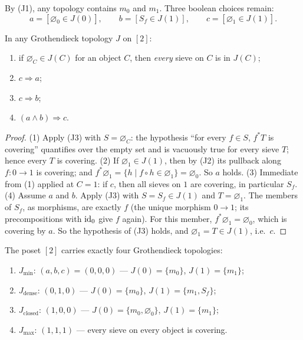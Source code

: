 By (J1), any topology contains $m_0$ and $m_1$. Three boolean
choices remain:
\[
a = [\varnothing_0 \in J(0)], \qquad
b = [S_f \in J(1)], \qquad
c = [\varnothing_1 \in J(1)].
\]

\begin{lemma}\label{ch03:lem:forcing}
In any Grothendieck topology $J$ on $[2]$:
\begin{enumerate}
\item if $\varnothing_C \in J(C)$ for an object $C$, then
\emph{every} sieve on $C$ is in $J(C)$;
\item $c \Rightarrow a$;
\item $c \Rightarrow b$;
\item $(a \wedge b) \Rightarrow c$.
\end{enumerate}
\end{lemma}

\begin{proof}
(1) Apply (J3) with $S = \varnothing_C$: the hypothesis ``for
every $f \in S$, $f^* T$ is covering'' quantifies over the empty
set and is vacuously true for every sieve $T$; hence every $T$ is
covering. (2) If $\varnothing_1 \in J(1)$, then by (J2) its
pullback along $f : 0 \to 1$ is covering; and
$f^* \varnothing_1 = \{h \mid f \circ h \in \varnothing_1\} =
\varnothing_0$. So $a$ holds. (3) Immediate from (1) applied at
$C = 1$: if $c$, then all sieves on $1$ are covering, in
particular $S_f$. (4) Assume $a$ and $b$. Apply (J3) with
$S = S_f \in J(1)$ and $T = \varnothing_1$. The members of
$S_f$, as morphisms, are exactly $f$ (the unique morphism
$0 \to 1$; its precompositions with $\mathrm{id}_0$ give $f$ again). For
this member, $f^* \varnothing_1 = \varnothing_0$, which is
covering by $a$. So the hypothesis of (J3) holds, and
$\varnothing_1 = T \in J(1)$, i.e.\ $c$.
\end{proof}

\begin{theorem}[Classification]\label{ch03:thm:four-topologies}
The poset $[2]$ carries exactly four Grothendieck topologies:
\begin{enumerate}
\item $J_{\min}$: $(a, b, c) = (0, 0, 0)$ ---
$J(0) = \{m_0\}$, $J(1) = \{m_1\}$;
\item $J_{\mathrm{dense}}$: $(0, 1, 0)$ ---
$J(0) = \{m_0\}$, $J(1) = \{m_1, S_f\}$;
\item $J_{\mathrm{closed}}$: $(1, 0, 0)$ ---
$J(0) = \{m_0, \varnothing_0\}$, $J(1) = \{m_1\}$;
\item $J_{\max}$: $(1, 1, 1)$ --- every sieve on every object is
covering.
\end{enumerate}
\end{theorem}

